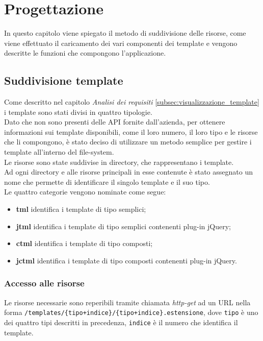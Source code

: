 
\chapter{Progettazione}
\label{cap:progettazione}
In questo capitolo viene spiegato il metodo di suddivisione delle risorse, come viene effettuato il caricamento dei vari componenti dei template e vengono descritte le funzioni che compongono l'applicazione.
\section{Suddivisione template}
Come descritto nel capitolo \textit{Analisi dei requisiti} \ref{subsec:visualizzazione_template} i template sono stati divisi in quattro tipologie.\\
Dato che non sono presenti delle API fornite dall'azienda, per ottenere informazioni sui template disponibili, come il loro numero, il loro tipo e le risorse che li compongono, è stato deciso di utilizzare un metodo semplice per gestire i template all'interno del file-system.\\
Le risorse sono state suddivise in directory, che rappresentano i template.\\
Ad ogni directory e alle risorse principali in esse contenute è stato assegnato un nome che permette di identificare il singolo template e il suo tipo.\\
Le quattro categorie vengono nominate come segue:
\begin{itemize}
	\item \textbf{tml} identifica i template di tipo semplici;
	\item \textbf{jtml} identifica i template di tipo semplici contenenti plug-in jQuery;
	\item \textbf{ctml} identifica i template di tipo composti;
	\item \textbf{jctml} identifica i template di tipo composti contenenti plug-in jQuery.
\end{itemize}
\subsection{Accesso alle risorse}
Le risorse necessarie sono reperibili tramite chiamata \textit{http-get} ad un URL nella forma \texttt{/templates/\{tipo+indice\}/\{tipo+indice\}.estensione}, dove \texttt{tipo} è uno dei quattro tipi descritti in precedenza, \texttt{indice} è il numero che identifica il template.

